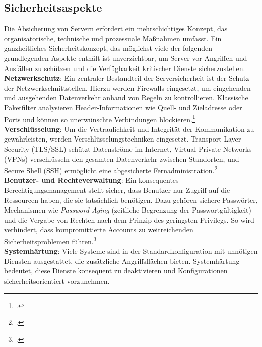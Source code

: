\documentclass[12pt,a4paper]{report}
\begin{document}
  \subsection{Sicherheitsaspekte}
  Die Absicherung von Servern erfordert ein mehrschichtiges Konzept, 
  das organisatorische, technische und prozessuale Maßnahmen umfasst.
  Ein ganzheitliches Sicherheitskonzept, das möglichst viele der folgenden grundlegenden Aspekte enthält ist unverzichtbar, 
  um Server vor Angriffen und Ausfällen zu schützen und die Verfügbarkeit kritischer Dienste sicherzustellen.
  \\
  \newline
  \textbf{Netzwerkschutz}:  
  Ein zentraler Bestandteil der Serversicherheit ist der Schutz der Netzwerkschnittstellen. 
  Hierzu werden Firewalls eingesetzt, um eingehenden und ausgehenden Datenverkehr anhand von Regeln zu kontrollieren. 
  Klassische Paketfilter analysieren Header-Informationen wie Quell- und Zieladresse oder Ports und können so unerwünschte Verbindungen blockieren.\footcite[Vgl.][S.~932~ff.]{nemeth_unixlinux}  
  \\
  \newline
  \textbf{Verschlüsselung}:  
  Um die Vertraulichkeit und Integrität der Kommunikation zu gewährleisten, werden Verschlüsselungstechniken eingesetzt. 
  Transport Layer Security (TLS/SSL) schützt Datenströme im Internet, Virtual Private Networks (VPNs) verschlüsseln den gesamten Datenverkehr zwischen Standorten, 
  und Secure Shell (SSH) ermöglicht eine abgesicherte Fernadministration.\footcite[Vgl.][S.~801, S.~971, S.~926~ff., S.~942]{nemeth_unixlinux}  
  \\
  \newline
  \textbf{Benutzer- und Rechteverwaltung}:  
  Ein konsequentes Berechtigungsmanagement stellt sicher, dass Benutzer nur Zugriff auf die Ressourcen haben, die sie tatsächlich benötigen. 
  Dazu gehören sichere Passwörter, Mechanismen wie \emph{Password Aging} (zeitliche Begrenzung der Passwortgültigkeit) 
  und die Vergabe von Rechten nach dem Prinzip des geringsten Privilegs. 
  So wird verhindert, dass kompromittierte Accounts zu weitreichenden Sicherheitsproblemen führen.\footcite[Vgl.][S.~905~ff.]{nemeth_unixlinux}  
  \\
  \newline
  \textbf{Systemhärtung}:  
  Viele Systeme sind in der Standardkonfiguration mit unnötigen Diensten ausgestattet, die zusätzliche Angriffsflächen bieten. 
  Systemhärtung bedeutet, diese Dienste konsequent zu deaktivieren und Konfigurationen sicherheitsorientiert vorzunehmen. 
\end{document}
